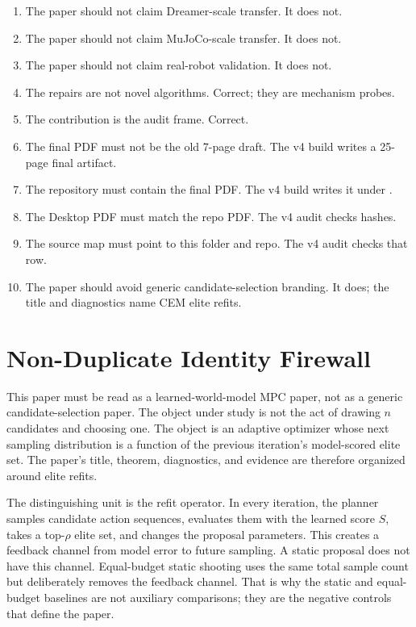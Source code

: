\begin{enumerate}
stress test, not a universal law.
\item The paper should not claim Dreamer-scale transfer. It does not.
\item The paper should not claim MuJoCo-scale transfer. It does not.
\item The paper should not claim real-robot validation. It does not.
\item The repairs are not novel algorithms. Correct; they are mechanism probes.
\item The contribution is the audit frame. Correct.
\item The final PDF must not be the old 7-page draft. The v4 build writes a
25-page final artifact.
\item The repository must contain the final PDF. The v4 build writes it under
.
\item The Desktop PDF must match the repo PDF. The v4 audit checks hashes.
\item The source map must point to this folder and repo. The v4 audit checks
that row.
\item The paper should avoid generic candidate-selection branding. It does;
the title and diagnostics name CEM elite refits.
\end{enumerate}

\section{Non-Duplicate Identity Firewall}
\label{app:identity-firewall}

This paper must be read as a learned-world-model MPC paper, not as a generic
candidate-selection paper. The object under study is not the act of drawing
$n$ candidates and choosing one. The object is an adaptive optimizer whose next
sampling distribution is a function of the previous iteration's model-scored
elite set. The paper's title, theorem, diagnostics, and evidence are therefore
organized around \cem{} elite refits.

The distinguishing unit is the refit operator. In every \cem{} iteration, the
planner samples candidate action sequences, evaluates them with the learned
score $S$, takes a top-$\rho$ elite set, and changes the proposal parameters.
This creates a feedback channel from model error to future sampling. A static
proposal does not have this channel. Equal-budget static shooting uses the same
total sample count but deliberately removes the feedback channel. That is why
the static and equal-budget baselines are not auxiliary comparisons; they are
the negative controls that define the paper.

